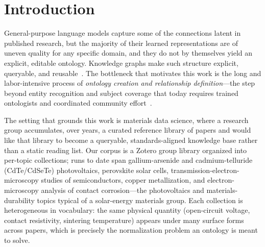 \documentclass[Afour,sageh,times]{sagej}
\begin{document}
\section{Introduction}
General-purpose language models capture some of the connections latent in published research,
but the majority of their learned representations are of uneven quality for any specific domain,
and they do not by themselves yield an explicit, editable ontology. Knowledge graphs make such
structure explicit, queryable, and reusable~\cite{hogan2021kg,pan2024unifying}. The bottleneck
that motivates this work is the long and labor-intensive process of \emph{ontology creation and
relationship definition}---the step beyond entity recognition and subject coverage that today
requires trained ontologists and coordinated community effort~\cite{smith2007obo}.

The setting that grounds this work is materials data science, where a research group accumulates,
over years, a curated reference library of papers and would like that library to become a queryable,
standards-aligned knowledge base rather than a static reading list. Our corpus is a Zotero group
library organized into per-topic collections; runs to date span gallium-arsenide and
cadmium-telluride (CdTe/CdSeTe) photovoltaics, perovskite solar cells, transmission-electron-microscopy
studies of semiconductors, copper metallization, and electron-microscopy analysis of contact
corrosion---the photovoltaics and materials-durability topics typical of a solar-energy materials
group. Each collection is heterogeneous in vocabulary: the same physical quantity (open-circuit
voltage, contact resistivity, sintering temperature) appears under many surface forms across papers,
which is precisely the normalization problem an ontology is meant to solve.
\end{document}
